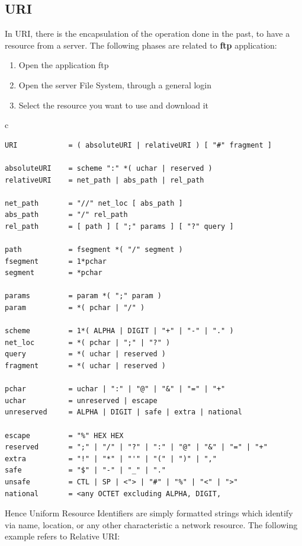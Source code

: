 \subsection{URI}
In URI, there is the encapsulation of the operation done in the past, to have a resource from a server\cite{RFC3986}. The following phases are related to \textbf{ftp} application:
\begin{enumerate}
\item{Open the application ftp}
\item{Open the server File System, through a general login}
\item{Select the resource you want to use and download it}
\end{enumerate}
\begin{center}
\begin{tabular}{c}
\begin{lstlisting}[linewidth=320pt, basicstyle=\footnotesize\sffamily,]
URI            = ( absoluteURI | relativeURI ) [ "#" fragment ]

absoluteURI    = scheme ":" *( uchar | reserved )
relativeURI    = net_path | abs_path | rel_path

net_path       = "//" net_loc [ abs_path ]
abs_path       = "/" rel_path
rel_path       = [ path ] [ ";" params ] [ "?" query ]

path           = fsegment *( "/" segment )
fsegment       = 1*pchar
segment        = *pchar

params         = param *( ";" param )
param          = *( pchar | "/" )

scheme         = 1*( ALPHA | DIGIT | "+" | "-" | "." )
net_loc        = *( pchar | ";" | "?" )
query          = *( uchar | reserved )
fragment       = *( uchar | reserved )

pchar          = uchar | ":" | "@" | "&" | "=" | "+"
uchar          = unreserved | escape
unreserved     = ALPHA | DIGIT | safe | extra | national

escape         = "%" HEX HEX
reserved       = ";" | "/" | "?" | ":" | "@" | "&" | "=" | "+"
extra          = "!" | "*" | "'" | "(" | ")" | ","
safe           = "$" | "-" | "_" | "."
unsafe         = CTL | SP | <"> | "#" | "%" | "<" | ">"
national       = <any OCTET excluding ALPHA, DIGIT,
\end{lstlisting}
\end{tabular}
\end{center}
Hence Uniform Resource Identifiers are simply formatted strings which identify via name, location, or any other characteristic a network resource. The following example refers to Relative URI:
